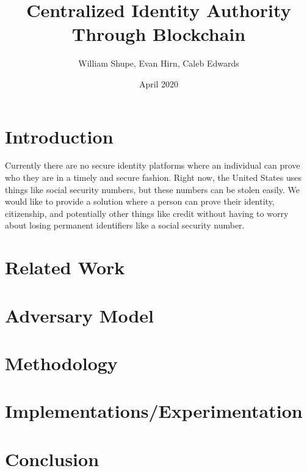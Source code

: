 \documentclass[letterpaper, 10 pt, conference]{ieeeconf}  %
\title{Centralized Identity Authority Through Blockchain}
\author{William Shupe, Evan Hirn, Caleb Edwards}
\date{April 2020}
\begin{document}
\maketitle

\section{Introduction}

Currently there are no secure identity platforms where an individual can prove
who they are in a timely and secure fashion. Right now, the United States uses things
like social security numbers, but these numbers can be stolen easily. We would like to
provide a solution where a person can prove their identity, citizenship, and potentially
other things like credit without having to worry about losing permanent identifiers like a
social security number.

\section{Related Work}

\section{Adversary Model}

\section{Methodology}

\section{Implementations/Experimentation}

\section{Conclusion}



\end{document}

